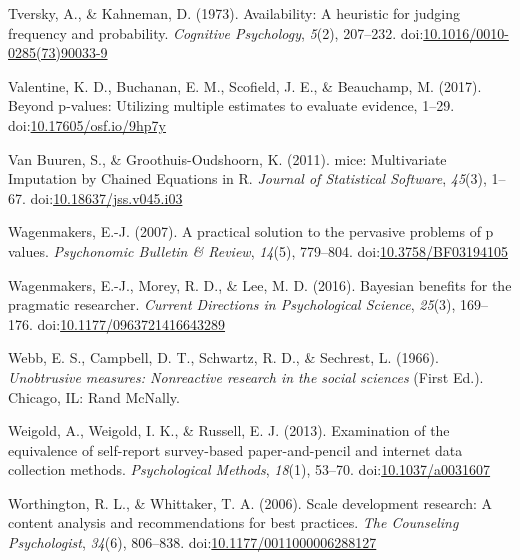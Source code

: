 \documentclass[english,man]{apa6}
\theoremstyle{definition}
\theoremstyle{definition}
\theoremstyle{definition}
\theoremstyle{remark}
\begin{document}
\hypertarget{ref-Tversky1973}{}
Tversky, A., \& Kahneman, D. (1973). Availability: A heuristic for
judging frequency and probability. \emph{Cognitive Psychology},
\emph{5}(2), 207--232.
doi:\href{https://doi.org/10.1016/0010-0285(73)90033-9}{10.1016/0010-0285(73)90033-9}

\hypertarget{ref-Valentine2017}{}
Valentine, K. D., Buchanan, E. M., Scofield, J. E., \& Beauchamp, M.
(2017). Beyond p-values: Utilizing multiple estimates to evaluate
evidence, 1--29.
doi:\href{https://doi.org/10.17605/osf.io/9hp7y}{10.17605/osf.io/9hp7y}

\hypertarget{ref-VanBuuren2011}{}
Van Buuren, S., \& Groothuis-Oudshoorn, K. (2011). mice: Multivariate
Imputation by Chained Equations in R. \emph{Journal of Statistical
Software}, \emph{45}(3), 1--67.
doi:\href{https://doi.org/10.18637/jss.v045.i03}{10.18637/jss.v045.i03}

\hypertarget{ref-Wagenmakers2007}{}
Wagenmakers, E.-J. (2007). A practical solution to the pervasive
problems of p values. \emph{Psychonomic Bulletin \& Review},
\emph{14}(5), 779--804.
doi:\href{https://doi.org/10.3758/BF03194105}{10.3758/BF03194105}

\hypertarget{ref-Wagenmakers2016a}{}
Wagenmakers, E.-J., Morey, R. D., \& Lee, M. D. (2016). Bayesian
benefits for the pragmatic researcher. \emph{Current Directions in
Psychological Science}, \emph{25}(3), 169--176.
doi:\href{https://doi.org/10.1177/0963721416643289}{10.1177/0963721416643289}

\hypertarget{ref-Webb1966}{}
Webb, E. S., Campbell, D. T., Schwartz, R. D., \& Sechrest, L. (1966).
\emph{Unobtrusive measures: Nonreactive research in the social sciences}
(First Ed.). Chicago, IL: Rand McNally.

\hypertarget{ref-Weigold2013}{}
Weigold, A., Weigold, I. K., \& Russell, E. J. (2013). Examination of
the equivalence of self-report survey-based paper-and-pencil and
internet data collection methods. \emph{Psychological Methods},
\emph{18}(1), 53--70.
doi:\href{https://doi.org/10.1037/a0031607}{10.1037/a0031607}

\hypertarget{ref-Worthington2006}{}
Worthington, R. L., \& Whittaker, T. A. (2006). Scale development
research: A content analysis and recommendations for best practices.
\emph{The Counseling Psychologist}, \emph{34}(6), 806--838.
doi:\href{https://doi.org/10.1177/0011000006288127}{10.1177/0011000006288127}
\end{document}
